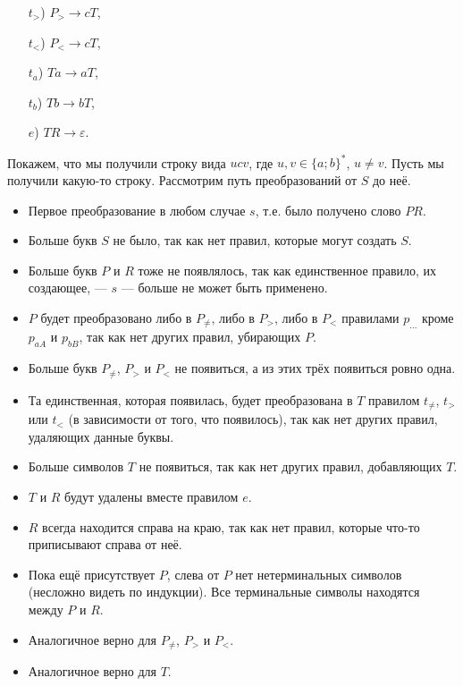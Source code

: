 \documentclass[12pt,a4paper]{article}
\begin{document}
\begin{problem}{5}
\begin{multicols}{5}
\begin{itemize}
                \item[$t_>$)] $P_> \to cT$,
                \item[$t_<$)] $P_< \to cT$,
                \item[$t_a$)] $Ta \to aT$,
                \item[$t_b$)] $Tb \to bT$,
                \item[$e$)] $TR \to \varepsilon$.  
            \end{itemize}
        \end{multicols}
        Покажем, что мы получили строку вида $ucv$, где $u, v \in \{a; b\}^*$, $u \neq v$. Пусть мы получили какую-то строку. Рассмотрим путь преобразований от $S$ до неё.
        \begin{itemize}
            \item Первое преобразование в любом случае $s$, т.е. было получено слово $PR$.
            \item Больше букв $S$ не было, так как нет правил, которые могут создать $S$.
            \item Больше букв $P$ и $R$ тоже не появлялось, так как единственное правило, их создающее, --- $s$ --- больше не может быть применено.
            \item $P$ будет преобразовано либо в $P_{\neq}$, либо в $P_>$, либо в $P_<$ правилами $p_{\dots}$ кроме $p_{aA}$ и $p_{bB}$, так как нет других правил, убирающих $P$.
            \item Больше букв $P_{\neq}$, $P_>$ и $P_<$ не появиться, а из этих трёх появиться ровно одна.
            \item Та единственная, которая появилась, будет преобразована в $T$ правилом $t_{\neq}$, $t_>$ или $t_<$ (в зависимости от того, что появилось), так как нет других правил, удаляющих данные буквы.
            \item Больше символов $T$ не появиться, так как нет других правил, добавляющих $T$.
            \item $T$ и $R$ будут удалены вместе правилом $e$.
            \item $R$ всегда находится справа на краю, так как нет правил, которые что-то приписывают справа от неё.
            \item Пока ещё присутствует $P$, слева от $P$ нет нетерминальных символов (несложно видеть по индукции). Все терминальные символы находятся между $P$ и $R$.
            \item Аналогичное верно для $P_{\neq}$, $P_>$ и $P_<$.
            \item Аналогичное верно для $T$.

\end{itemize}
\end{problem}
\end{document}
